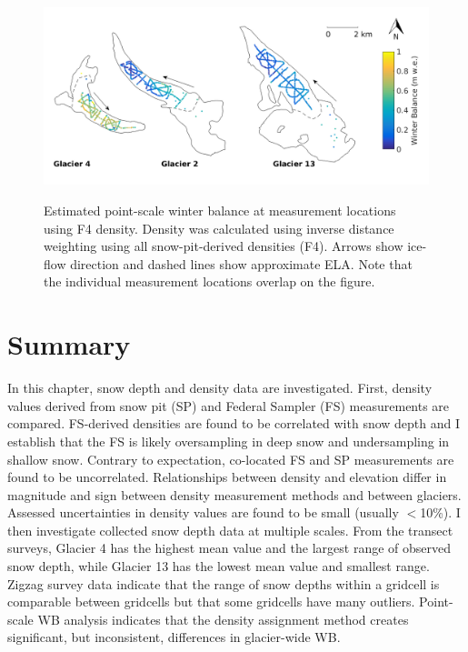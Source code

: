 \documentclass{sfuthesis}
\begin{document}
{\begin{figure}[H]
	\centering
	\includegraphics[width =\textwidth]{SWEmap_opt9.png}\\
	\caption[Estimated point-scale winter balance at measurement locations using F4 density]{Estimated point-scale winter balance at measurement locations using F4 density. Density was calculated using inverse distance weighting using all snow-pit-derived densities (F4). Arrows show ice-flow direction and dashed lines show approximate ELA. Note that the individual measurement locations overlap on the figure.}
	\label{fig:SWEmap_F4}
\end{figure}


\section{Summary}

In this chapter, snow depth and density data are investigated. First, density values derived from snow pit (SP) and Federal Sampler (FS) measurements are compared. FS-derived densities are found to be correlated with snow depth and I establish that the FS is likely oversampling in deep snow and undersampling in shallow snow. Contrary to expectation, co-located FS and SP measurements are found to be uncorrelated. Relationships between density and elevation differ in magnitude and sign between density measurement methods and between glaciers. Assessed uncertainties in density values are found to be small (usually $<$10\%). I then investigate collected snow depth data at multiple scales. From the transect surveys, Glacier 4 has the highest mean value and the largest range of observed snow depth, while Glacier 13 has the lowest mean value and smallest range. Zigzag survey data indicate that the range of snow depths within a gridcell is comparable between gridcells but that some gridcells have many outliers. Point-scale WB analysis indicates that the density assignment method creates significant, but inconsistent, differences in glacier-wide WB. 

}
\end{document}
